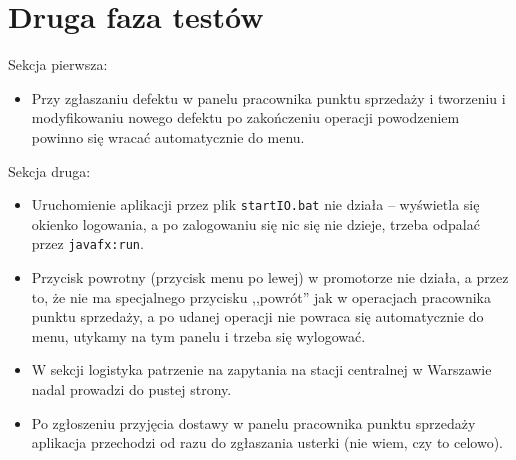 \documentclass[a4paper,12pt]{article}
\begin{document}
\section{Druga faza testów}

Sekcja pierwsza:
\begin{itemize}
    \item Przy zgłaszaniu defektu w panelu pracownika punktu sprzedaży i tworzeniu i modyfikowaniu nowego defektu po zakończeniu operacji powodzeniem powinno się wracać automatycznie do menu.
\end{itemize}

Sekcja druga:
\begin{itemize}
    \item Uruchomienie aplikacji przez plik \texttt{startIO.bat} nie działa -- wyświetla się okienko logowania, a po zalogowaniu się nic się nie dzieje, trzeba odpalać przez \texttt{javafx:run}.
    \item Przycisk powrotny (przycisk menu po lewej) w promotorze nie działa, a przez to, że nie ma specjalnego przycisku ,,powrót'' jak w operacjach pracownika punktu sprzedaży, a po udanej operacji nie powraca się automatycznie do menu, utykamy na tym panelu i trzeba się wylogować.
    \item W sekcji logistyka patrzenie na zapytania na stacji centralnej w Warszawie nadal prowadzi do pustej strony.
    \item Po zgłoszeniu przyjęcia dostawy w panelu pracownika punktu sprzedaży aplikacja przechodzi od razu do zgłaszania usterki (nie wiem, czy to celowo).
\end{itemize}
\end{document}
